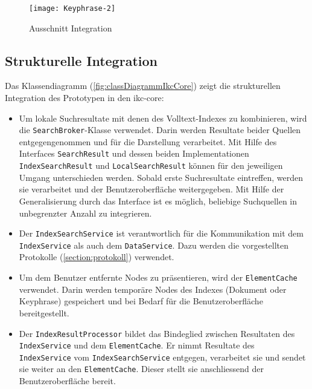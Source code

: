     \begin{figure}[H]
    \centering
    \texttt{[image: Keyphrase-2]}
    \caption{Ausschnitt Integration}
    \label{fig:partintegration}
    \end{figure}

\subsection{Strukturelle Integration}

Das Klassendiagramm (\autoref{fig:classDiagrammIkcCore}) zeigt die strukturellen Integration des Prototypen in den \gls{ikc-core}: 

\begin{itemize}
    \item Um lokale Suchresultate mit denen des Volltext-Indexes zu kombinieren, wird die \texttt{SearchBroker}-Klasse verwendet. Darin werden Resultate beider Quellen entgegengenommen und für die Darstellung verarbeitet. Mit Hilfe des Interfaces \texttt{SearchResult} und dessen beiden Implementationen \texttt{IndexSearchResult} und \texttt{LocalSearchResult} können für den jeweiligen Umgang un\-ter\-schied\-en werden. Sobald erste Suchresultate eintreffen, werden sie verarbeitet und der Benutzeroberfläche weitergegeben. Mit Hilfe der Generalisierung durch das Interface ist es möglich, beliebige Suchquellen in unbegrenzter Anzahl zu integrieren.\\ 
    \item Der \texttt{IndexSearchService} ist verantwortlich für die Kommunikation mit dem \texttt{IndexService} als auch dem \texttt{DataService}. Dazu werden die vorgestellten Protokolle (\autoref{section:protokoll}) verwendet.\\
    \item Um dem Benutzer entfernte Nodes zu präsentieren, wird der \texttt{ElementCache} verwendet. Darin werden temporäre Nodes des Indexes (Dokument oder \gls{Keyphrase}) gespeichert und bei Bedarf für die Benutzeroberfläche bereitgestellt.
    \item Der \texttt{IndexResultProcessor} bildet das Bindeglied zwischen Resultaten des \texttt{IndexService} und dem \texttt{ElementCache}. Er nimmt Resultate des \texttt{IndexService} vom \texttt{IndexSearchService} entgegen, verarbeitet sie und sendet sie weiter an den \texttt{ElementCache}. Dieser stellt sie anschliessend der Benutzeroberfläche bereit.\\

\end{itemize}


